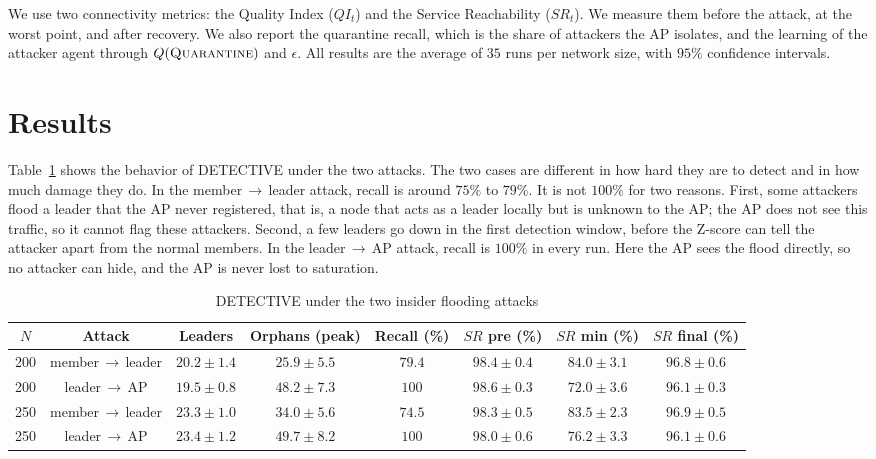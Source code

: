 \documentclass[conference]{IEEEtran}
\begin{document}
We use two connectivity metrics: the Quality Index ($QI_t$) and the
Service Reachability ($SR_t$). We measure them before the attack, at the worst
point, and after recovery. We also report the quarantine recall, which is the share
of attackers the AP isolates, and the learning of the attacker agent through
$Q(\textsc{Quarantine})$ and $\epsilon$. All results are the average of $35$ runs
per network size, with $95\%$ confidence intervals.

\section{Results}

Table~\ref{tab:detective} shows the behavior of DETECTIVE under the two attacks.
The two cases are different in how hard they are to detect and in how much damage
they do. In the member\,$\to$\,leader attack, recall is around $75\%$ to $79\%$.
It is not $100\%$ for two reasons. First, some attackers flood a leader
that the AP never registered, that is, a node that acts as a leader locally but is
unknown to the AP; the AP does not see this traffic, so it cannot flag these
attackers. Second, a few leaders go down in the first detection window, before the
Z-score can tell the attacker apart from the normal members. In the
leader\,$\to$\,AP attack, recall is $100\%$ in every
run. Here the AP sees the flood directly, so no attacker can hide, and the AP is
never lost to saturation.

\begin{table}[t]
\centering
\caption{DETECTIVE under the two insider flooding attacks}
\label{tab:detective}
\setlength{\tabcolsep}{10pt}
\renewcommand{\arraystretch}{1.2}
\begin{tabular}{cccccccc}
\hline
$N$ & Attack & Leaders & Orphans (peak) & Recall (\%) & $SR$ pre (\%) & $SR$ min (\%) & $SR$ final (\%) \\
\hline
200 & member\,$\to$\,leader & $20.2\pm1.4$ & $25.9\pm5.5$ & $79.4$ & $98.4\pm0.4$ & $84.0\pm3.1$ & $96.8\pm0.6$ \\
200 & leader\,$\to$\,AP      & $19.5\pm0.8$ & $48.2\pm7.3$ & $100$  & $98.6\pm0.3$ & $72.0\pm3.6$ & $96.1\pm0.3$ \\
\hline
250 & member\,$\to$\,leader & $23.3\pm1.0$ & $34.0\pm5.6$ & $74.5$ & $98.3\pm0.5$ & $83.5\pm2.3$ & $96.9\pm0.5$ \\
250 & leader\,$\to$\,AP      & $23.4\pm1.2$ & $49.7\pm8.2$ & $100$  & $98.0\pm0.6$ & $76.2\pm3.3$ & $96.1\pm0.6$ \\
\hline
\end{tabular}
\end{table}
\end{document}
